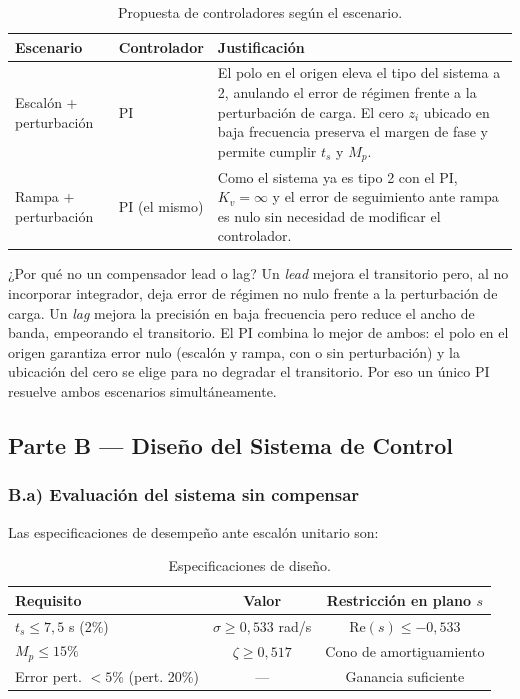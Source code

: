 \documentclass[12pt, a4paper]{article}
\begin{document}
\begin{table}[H]
\centering
\caption{Propuesta de controladores según el escenario.}
\begin{tabular}{@{}p{3.5cm}p{3.5cm}p{6cm}@{}}
\toprule
\textbf{Escenario} & \textbf{Controlador} & \textbf{Justificación} \\
\midrule
Escalón + perturbación & PI & El polo en el origen eleva el tipo del sistema a 2, anulando el error de régimen frente a la perturbación de carga. El cero $z_i$ ubicado en baja frecuencia preserva el margen de fase y permite cumplir $t_s$ y $M_p$. \\
\addlinespace
Rampa + perturbación & PI (el mismo) & Como el sistema ya es tipo 2 con el PI, $K_v=\infty$ y el error de seguimiento ante rampa es nulo sin necesidad de modificar el controlador. \\
\bottomrule
\end{tabular}
\end{table}

\noindent ¿Por qué no un compensador lead o lag? Un \emph{lead} mejora el transitorio pero, al no incorporar integrador, deja error de régimen no nulo frente a la perturbación de carga. Un \emph{lag} mejora la precisión en baja frecuencia pero reduce el ancho de banda, empeorando el transitorio. El PI combina lo mejor de ambos: el polo en el origen garantiza error nulo (escalón y rampa, con o sin perturbación) y la ubicación del cero se elige para no degradar el transitorio. Por eso un único PI resuelve ambos escenarios simultáneamente.

\subsection{Parte B — Diseño del Sistema de Control}

\subsubsection{B.a) Evaluación del sistema sin compensar}

Las especificaciones de desempeño ante escalón unitario son:

\begin{table}[H]
\centering
\caption{Especificaciones de diseño.}
\begin{tabular}{@{}lcc@{}}
\toprule
\textbf{Requisito} & \textbf{Valor} & \textbf{Restricción en plano $s$} \\
\midrule
$t_s \leq 7{,}5$ s (2\%) & $\sigma \geq 0{,}533$ rad/s & $\text{Re}(s) \leq -0{,}533$ \\
$M_p \leq 15\%$          & $\zeta \geq 0{,}517$        & Cono de amortiguamiento \\
Error pert. $< 5\%$ (pert. 20\%) & --- & Ganancia suficiente \\
\bottomrule
\end{tabular}
\end{table}
\end{document}
